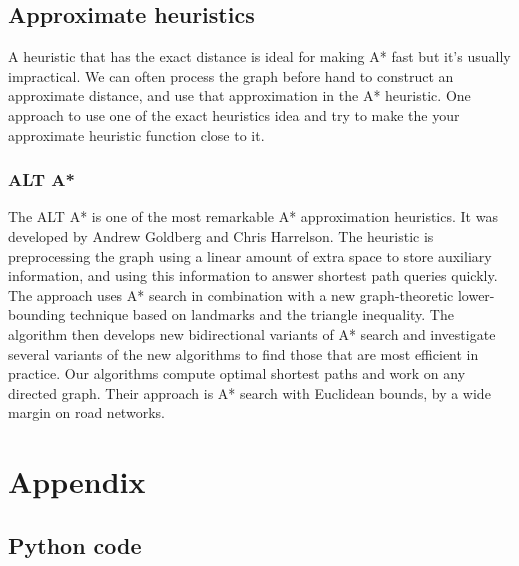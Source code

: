\documentclass[12pt]{article}
\begin{document}
\newpage
\subsection{Approximate heuristics}
A heuristic that has the exact distance is ideal for making A* fast but it’s usually impractical. We can often process the graph before hand to construct an approximate distance, and use that approximation in the A* heuristic. One approach to use one of the exact heuristics idea and try to make the your approximate heuristic function close to it.

\subsubsection{ALT A*}
The ALT A* is one of the most remarkable A* approximation heuristics. It was developed by Andrew Goldberg and Chris Harrelson\cite{goldberg2005computing}. The heuristic is preprocessing the graph using a linear amount of extra space to store auxiliary information, and using this information to answer shortest path queries quickly. The approach uses A* search in combination with a new graph-theoretic lower-bounding technique based on landmarks and the triangle inequality. The algorithm then develops new bidirectional variants of A* search and investigate several variants of the new algorithms to find those that are most efficient in practice. Our algorithms compute optimal shortest paths and work on any directed graph. Their approach is A* search with Euclidean bounds, by a wide margin on road networks.

\printbibliography

\section{Appendix}
\subsection{Python code}
\label{sec:pythonCode}

\end{document}
